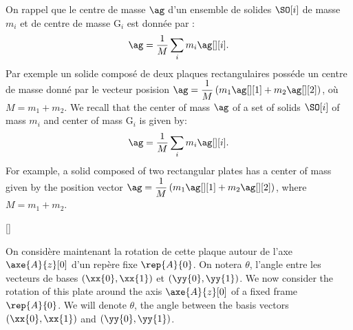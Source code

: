 \documentclass[11pt,a4paper,twoside]{article} %
\begin{document}
\reponse[6cm]
{
\[
    S=\dfrac{3}{4}a^2
\]
\[
    M=\sigma\dfrac{3}{4}a^2
\]
}%

\fr
{On rappel que le centre de masse $\ag$ d'un ensemble de solides $\SO[i]$ de masse $m_i$ et 
de centre de masse G$_i$ est donnée par : 
\[
    \ag=\dfrac{1}{M}\sum_i m_i\ag[][i].
\]
Par exemple un solide composé de deux plaques rectangulaires posséde un centre de masse donné par
le vecteur posision $\ag=\dfrac{1}{M}\left(m_1 \ag[][1] + m_2 \ag[][2]\right)$, où $M=m_1+m_2$.}
{We recall that the center of mass $\ag$ of a set of solids $\SO[i]$ of mass $m_i$ and center of 
mass G$_i$ is given by: 
\[
\ag=\dfrac{1}{M}\sum_i m_i\ag[][i]. 
\]
For example, a solid composed of two rectangular plates has a center of mass given by the position vector 
$\ag=\dfrac{1}{M}\left(m_1 \ag[][1] + m_2 \ag[][2]\right)$, where $M=m_1+m_2$.}

\reponse[5cm]
{%
\[
    \ag=\dfrac{a}{2}\xx{1}+\dfrac{5a}{12}\yy{1}
\]
}[\clearpage]

\fr
{On considère maintenant la rotation de cette plaque autour de l'axe $\axe{A}{z}[0]$ d'un repère fixe $\rep{A}{0}$.
 On notera $\theta$, l'angle entre les vecteurs de bases $(\xx{0},\xx{1})$ et $(\yy{0},\yy{1})$.}
{We now consider the rotation of this plate around the axis $\axe{A}{z}[0]$ of a fixed frame $\rep{A}{0}$.
 We will denote $\theta$, the angle between the basis vectors $(\xx{0},\xx{1})$ and $(\yy{0},\yy{1})$.}
\reponse[5cm]
{
\begin{center}
    \begin{tikzpicture}
        \figplanes[][theta][][1][][0][]{[][][][A][][][]}
    \end{tikzpicture}
\end{center}
}

\reponse[6cm]
{
\[
    \xx{1}=\cos\theta\xx{0}+\sin\theta\yy{0}
\]

\[
    \yy{1}=-\sin\theta\xx{0}+\cos\theta\yy{0}
\]
\[
    \ag=\dfrac{a}{2}\left(\cos\theta\xx{0}+\sin\theta\yy{0}\right)+\dfrac{5a}{12}\left(-\sin\theta\xx{0}+\cos\theta\yy{0}\right)
\]
\[  
    \ag=\left(\dfrac{a}{2}\cos\theta-\dfrac{5a}{12}\sin\theta\right)\xx{0}+\left(\dfrac{a}{2}\sin\theta+\dfrac{5a}{12}\cos\theta\right)\yy{0}                                                                                                                             \]
}
\end{document}
